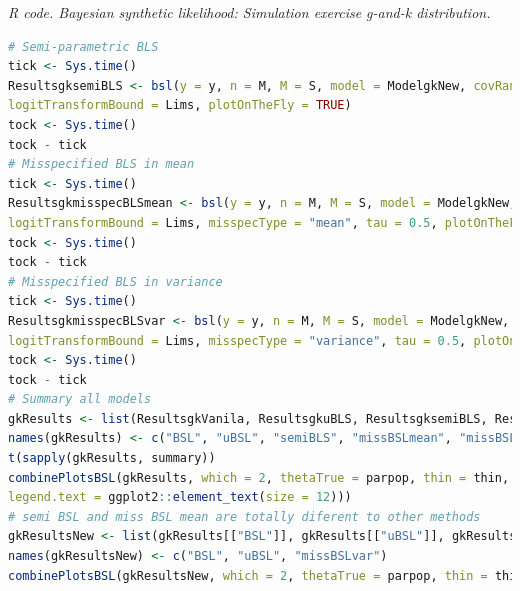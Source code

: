 \begin{enumerate}[leftmargin=*]
\begin{tcolorbox}[enhanced,width=4.67in,center upper,
	fontupper=\large\bfseries,drop shadow southwest,sharp corners]
	\textit{R code. Bayesian synthetic likelihood: Simulation exercise g-and-k distribution.}
	\begin{VF}
		\begin{lstlisting}[language=R]
# Semi-parametric BLS
tick <- Sys.time()
ResultsgksemiBLS <- bsl(y = y, n = M, M = S, model = ModelgkNew, covRandWalk = tune*CovarRW, method = "semiBSL", thetaNames = expression(theta, a, b, g, k),
logitTransformBound = Lims, plotOnTheFly = TRUE)
tock <- Sys.time()
tock - tick
# Misspecified BLS in mean
tick <- Sys.time()
ResultsgkmisspecBLSmean <- bsl(y = y, n = M, M = S, model = ModelgkNew, covRandWalk = tune*CovarRW, method = "BSLmisspec", thetaNames = expression(theta, a, b, g, k),
logitTransformBound = Lims, misspecType = "mean", tau = 0.5, plotOnTheFly = TRUE)
tock <- Sys.time()
tock - tick
# Misspecified BLS in variance
tick <- Sys.time()
ResultsgkmisspecBLSvar <- bsl(y = y, n = M, M = S, model = ModelgkNew, covRandWalk = tune*CovarRW, method = "BSLmisspec", thetaNames = expression(theta, a, b, g, k), 
logitTransformBound = Lims, misspecType = "variance", tau = 0.5, plotOnTheFly = TRUE)
tock <- Sys.time()
tock - tick
# Summary all models
gkResults <- list(ResultsgkVanila, ResultsgkuBLS, ResultsgksemiBLS, ResultsgkmisspecBLSmean, ResultsgkmisspecBLSvar)
names(gkResults) <- c("BSL", "uBSL", "semiBLS", "missBSLmean", "missBSLvar")
t(sapply(gkResults, summary))
combinePlotsBSL(gkResults, which = 2, thetaTrue = parpop, thin = thin, options.linetype = list(values = 1:8), options.size = list(values = rep(1, 8)), options.theme = list(plot.margin = grid::unit(rep(0.03, 4), "npc"), axis.title = ggplot2::element_text(size = 12), axis.text = ggplot2::element_text(size = 8),
legend.text = ggplot2::element_text(size = 12)))
# semi BSL and miss BSL mean are totally diferent to other methods 
gkResultsNew <- list(gkResults[["BSL"]], gkResults[["uBSL"]], gkResults[["missBSLvar"]])
names(gkResultsNew) <- c("BSL", "uBSL", "missBSLvar")
combinePlotsBSL(gkResultsNew, which = 2, thetaTrue = parpop, thin = thin, options.linetype = list(values = 1:8), options.size = list(values = rep(1, 8)), options.theme = list(plot.margin = grid::unit(rep(0.03, 4), "npc"), legend.text = ggplot2::element_text(size = 12)))
\end{lstlisting}
	\end{VF}
\end{tcolorbox}


\end{enumerate}
